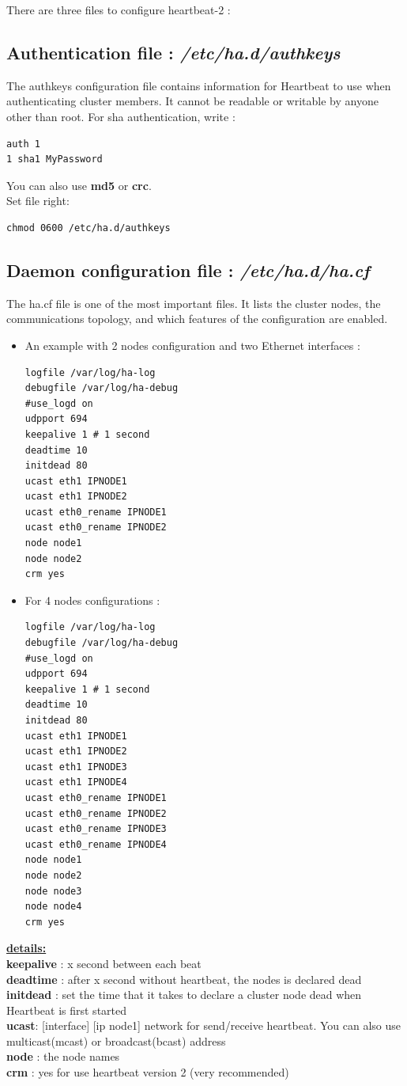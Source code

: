 \documentclass[a4paper,10pt]{report}
\begin{document}
There are three files to configure heartbeat-2 :
\subsection{Authentication file : \textit{/etc/ha.d/authkeys}}
The authkeys configuration file contains information for Heartbeat to use when authenticating cluster members. It cannot be readable or writable by anyone other than root. For sha authentication, write :
\begin{lstlisting}
auth 1
1 sha1 MyPassword
\end{lstlisting}
You can also use \textbf{md5} or \textbf{crc}.\\
Set file right:
\begin{lstlisting}
chmod 0600 /etc/ha.d/authkeys
\end{lstlisting}

\subsection{Daemon configuration file : \textit{/etc/ha.d/ha.cf}}

The ha.cf file is one of the most important files. It lists the cluster nodes, the communications topology, and which features of the configuration are enabled. 
\begin{itemize}
\item An example with 2 nodes configuration and two Ethernet interfaces :
\begin{lstlisting}
logfile /var/log/ha-log
debugfile /var/log/ha-debug
#use_logd on
udpport 694
keepalive 1 # 1 second
deadtime 10
initdead 80
ucast eth1 IPNODE1
ucast eth1 IPNODE2
ucast eth0_rename IPNODE1
ucast eth0_rename IPNODE2
node node1
node node2
crm yes
\end{lstlisting}

\item For 4 nodes configurations :
\begin{lstlisting}
logfile /var/log/ha-log
debugfile /var/log/ha-debug
#use_logd on
udpport 694
keepalive 1 # 1 second
deadtime 10
initdead 80
ucast eth1 IPNODE1
ucast eth1 IPNODE2
ucast eth1 IPNODE3
ucast eth1 IPNODE4
ucast eth0_rename IPNODE1
ucast eth0_rename IPNODE2
ucast eth0_rename IPNODE3
ucast eth0_rename IPNODE4
node node1
node node2
node node3
node node4
crm yes
\end{lstlisting}
\end{itemize}

\textbf{\underline{details:}}\\
\textbf{keepalive} : x second between each beat\\
\textbf{deadtime} : after x second without heartbeat, the nodes is declared dead\\
\textbf{initdead} : set the time that it takes to declare a cluster node dead when Heartbeat is first started\\
\textbf{ucast}: [interface] [ip node1] network for send/receive heartbeat. You can also use multicast(mcast) or broadcast(bcast) address\\
\textbf{node} : the node names\\
\textbf{crm} : yes for use heartbeat version 2 (very recommended)\\
\end{document}
